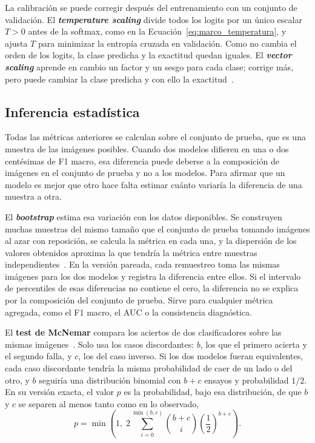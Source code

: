 La calibración se puede corregir después del entrenamiento con un conjunto de validación. El
\textbf{\emph{temperature scaling}} divide todos los logits por un único escalar $T>0$ antes de la softmax, como en la
Ecuación~\ref{eq:marco_temperatura}, y ajusta $T$ para minimizar la entropía cruzada en validación. Como no
cambia el orden de los logits, la clase predicha y la exactitud quedan iguales. El \textbf{\emph{vector scaling}}
aprende en cambio un factor y un sesgo para cada clase; corrige más, pero puede cambiar la clase predicha y
con ello la exactitud~\cite{guo2017calibration}.

\subsection{Inferencia estadística}
\label{sec:marco_eval_estadistica}

Todas las métricas anteriores se calculan sobre el conjunto de prueba, que es una muestra de las imágenes posibles. Cuando dos
modelos difieren en una o dos centésimas de F1 macro, esa diferencia puede deberse a la composición de imágenes en
el conjunto de prueba y no a los modelos. Para afirmar que un modelo es mejor que otro hace falta estimar cuánto
variaría la diferencia de una muestra a otra.

El \textbf{\emph{bootstrap}} estima esa variación con los datos disponibles. Se construyen muchas muestras del
mismo tamaño que el conjunto de prueba tomando imágenes al azar con reposición, se calcula la métrica en cada una, y la
dispersión de los valores obtenidos aproxima la que tendría la métrica entre muestras
independientes~\cite{efron1979bootstrap}. En la versión pareada, cada remuestreo toma las mismas imágenes para
los dos modelos y registra la diferencia entre ellos. Si el intervalo de percentiles de esas diferencias no
contiene el cero, la diferencia no se explica por la composición del conjunto de prueba. Sirve para cualquier métrica
agregada, como el F1 macro, el AUC o la consistencia diagnóstica.

El \textbf{test de McNemar} compara los aciertos de dos clasificadores sobre las mismas
imágenes~\cite{mcnemar1947note}. Solo usa los casos discordantes: $b$, los que el primero acierta y el segundo
falla, y $c$, los del caso inverso. Si los dos modelos fueran equivalentes, cada caso discordante tendría la misma
probabilidad de caer de un lado o del otro, y $b$ seguiría una distribución binomial con $b+c$ ensayos y
probabilidad $1/2$. En su versión exacta, el valor $p$ es la probabilidad, bajo esa distribución, de que $b$ y $c$
se separen al menos tanto como en lo observado,
\begin{equation}
    p = \min\!\left(1,\; 2\sum_{i=0}^{\min(b,c)} \binom{b+c}{i} \left(\frac{1}{2}\right)^{b+c}\right).
    \label{eq:marco_mcnemar}
\end{equation}

